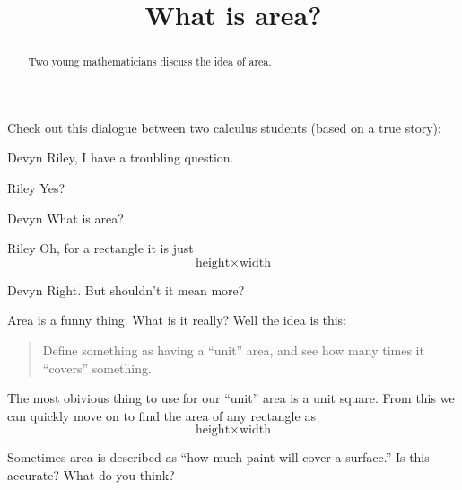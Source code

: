 \documentclass{ximera}
\title[Break-Ground:]{What is area?}
\begin{document}
\begin{abstract}
Two young mathematicians discuss the idea of area.
\end{abstract}
\maketitle




Check out this dialogue between two calculus students (based on a true
story):

\begin{dialogue}
\item[Devyn] Riley, I have a troubling question.
\item[Riley] Yes? 
\item[Devyn] What is area?
\item[Riley] Oh, for a rectangle it is just
  \[
  \text{height}
  \times
  \text{width}
  \]
\item[Devyn] Right. But shouldn't it mean more?
\end{dialogue}

Area is a funny thing. What is it really? Well the idea is this:
\begin{quote}
Define something as having a ``unit'' area, and see how many times it
``covers'' something.
\end{quote}
The most obivious thing to use for our ``unit'' area is a unit
square. From this we can quickly move on to find the area of any
rectangle as
  \[
  \text{height}
  \times
  \text{width}
  \]
\begin{problem}
  Sometimes area is described as ``how much paint will cover a surface.''
  Is this accurate? What do you think?
  \begin{freeResponse}
  \end{freeResponse}
\end{problem}
%
\end{document}
